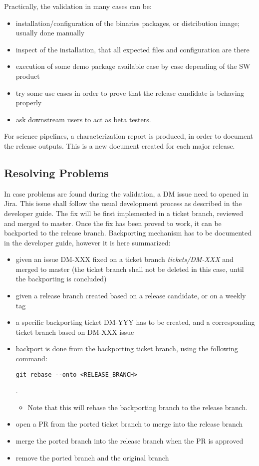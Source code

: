 Practically, the validation in many cases can be:

\begin{itemize}
\item installation/configuration of the binaries packages, or distribution image; usually done manually
\item inspect of the installation, that all expected files and configuration are there
\item execution of some demo package available case by case depending of the SW product
\item try some use cases in order to prove that the release candidate is behaving properly
\item ask downstream users to act as beta testers.
\end{itemize}

For science pipelines, a characterization report is produced, in order to document the release outputs.
This is a new document created for each major release.


\subsection{Resolving Problems}

In case problems are found during the validation, a DM issue need to opened in Jira.
This issue shall follow the usual development process as described in the developer guide. 
The fix will be first implemented in a ticket branch, reviewed and merged to master.
Once the fix has been proved to work, it can be backported to the release branch. 
Backporting mechanism has to be documented in the developer guide, however it is here summarized:

\begin{itemize}
\item given an issue DM-XXX fixed on a ticket branch \textit{tickets/DM-XXX} and merged to master (the ticket branch shall not be deleted in this case, until the backporting is concluded)
\item given a release branch created based on a release candidate, or on a weekly tag
\item a specific backporting ticket DM-YYY has to be created, and a corresponding ticket branch based on DM-XXX issue
\item backport is done from the backporting ticket branch, using the following command: \begin{verbatim}git rebase --onto <RELEASE_BRANCH>\end{verbatim} . 
\begin{itemize}
\item Note that this will rebase the backporting branch to the release branch.
\end{itemize}
\item open a PR from the ported ticket branch to merge into the release branch
\item merge the ported branch into the release branch when the PR is approved
\item remove the ported branch and the original branch
\end{itemize}

